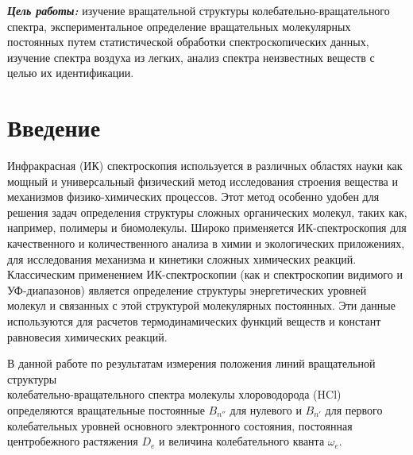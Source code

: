 \begin{center}
\end{center}

\textbf{\emph{Цель работы:}} изучение вращательной структуры колебательно-вращательного спектра, экспериментальное определение вращательных молекулярных постоянных путем статистической обработки спектроскопических данных, изучение спектра воздуха из легких, анализ спектра неизвестных веществ с целью их идентификации.
\section{Введение}
Инфракрасная (ИК) спектроскопия используется в различных областях науки как мощный и универсальный физический метод исследования строения вещества и механизмов физико-химических процессов.
Этот метод особенно удобен для решения задач определения структуры
сложных органических молекул, таких как, например, полимеры и биомолекулы. Широко применяется ИК-спектроскопия для качественного
и количественного анализа в химии и экологических приложениях, для
исследования механизма и кинетики сложных химических реакций.
Классическим применением ИК-спектроскопии (как и спектроскопии
видимого и УФ-диапазонов) является определение структуры энергетических уровней молекул и связанных с этой структурой молекулярных
постоянных. Эти данные используются для расчетов термодинамических функций веществ и констант равновесия химических реакций.

В данной работе по результатам измерения положения линий вращательной структуры \\колебательно-вращательного спектра молекулы
хлороводорода (HCl) определяются вращательные постоянные $B_{n''}$ для
нулевого и $B_{n'}$ для первого колебательных уровней основного электронного состояния, постоянная центробежного растяжения $D_e$ и величина колебательного кванта $\omega_e$.
